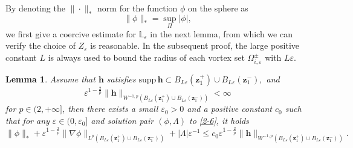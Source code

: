 \documentclass[12pt,reqno]{amsart}
\numberwithin{equation}{section}
\newtheorem{lemma}[theorem]{Lemma}
\theoremstyle{definition}
\theoremstyle{remark}
\newcommand{\ep}{\varepsilon}
\begin{document}
By denoting the $\|\cdot\|_*$ norm for the function $\phi$ on the sphere as  
$$\|\phi\|_*=\sup_\Pi |\phi|,$$
we first give a coercive estimate for $\mathbb L_\varepsilon$ in the next lemma, from which we can verify the choice of $Z_\varepsilon$ is reasonable. 
In the subsequent proof, the large positive constant $L$ is always used to bound the radius of each vortex set $\Omega_{i,\varepsilon}^\pm$ with $L\ep$. 
\begin{lemma}\label{lem2-2}
	Assume that $\mathbf h$ satisfies $\mathrm{supp}\, \mathbf h\subset B_{L\varepsilon}(\boldsymbol z_1^+)\cup B_{L\varepsilon}(\boldsymbol z_1^-),$ and $$\varepsilon^{1-\frac{2}{p}}\|\mathbf h\|_{W^{-1,p}(B_{L\varepsilon}(\boldsymbol z_1^+)\cup B_{L\varepsilon}(\boldsymbol z_1^-))}<\infty$$
	for $p\in (2,+\infty]$, then there exists a small $\varepsilon_0>0$ and a positive constant $c_0$ such that for any $\varepsilon\in(0,\varepsilon_0]$ and solution pair $(\phi,\Lambda)$ to \eqref{2-6}, it holds
	\begin{equation}\label{2-7}
		\|\phi\|_*+\varepsilon^{1-\frac{2}{p}}\|\nabla\phi\|_{L^p(B_{L\varepsilon}(\boldsymbol z_1^+)\cup B_{L\varepsilon}(\boldsymbol z_1^-))}+|\Lambda|\varepsilon^{-1}\le c_0\varepsilon^{1-\frac{2}{p}}\|\mathbf h\|_{W^{-1,p}(B_{L\varepsilon}(\boldsymbol z_1^+)\cup B_{L\varepsilon}(\boldsymbol z_1^-))}.
	\end{equation}
\end{lemma}
\end{document}
